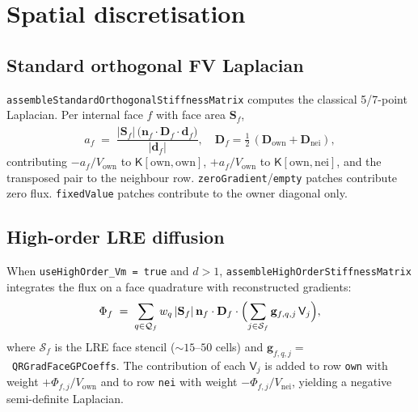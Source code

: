 \documentclass[11pt,a4paper]{article}
\newcommand{\Dten}{\mathbf{D}}
\newcommand{\Kstif}{\mathsf{K}}
\newcommand{\code}[1]{\texttt{\small #1}}
\begin{document}
\section{Spatial discretisation}

\subsection{Standard orthogonal FV Laplacian}

\code{assembleStandardOrthogonalStiffnessMatrix} computes the classical
5/7-point Laplacian. Per internal face $f$ with face area $\mathbf{S}_{f}$,
\begin{equation}
  a_{f} \;=\;
   \frac{ \lvert \mathbf{S}_{f} \rvert\,
          \bigl( \mathbf{n}_{f} \cdot \Dten_{f} \cdot \hat{\mathbf{d}}_{f} \bigr) }
        { \lvert \mathbf{d}_{f} \rvert },
   \quad
   \Dten_{f} = \tfrac{1}{2}\,(\Dten_{\text{own}} + \Dten_{\text{nei}}),
\end{equation}
contributing $-a_{f}/V_{\text{own}}$ to $\Kstif[\text{own},\text{own}]$,
$+a_{f}/V_{\text{own}}$ to $\Kstif[\text{own},\text{nei}]$, and the
transposed pair to the neighbour row. \code{zeroGradient}/\code{empty}
patches contribute zero flux. \code{fixedValue} patches contribute to
the owner diagonal only.

\subsection{High-order LRE diffusion}

When \code{useHighOrder\_Vm = true} and $d>1$,
\code{assembleHighOrderStiffnessMatrix} integrates the flux on a face
quadrature with reconstructed gradients:
\begin{equation}
  \Phi_{f} \;=\;
   \sum_{q \in \mathcal{Q}_{f}}
       w_{q}\, \lvert \mathbf{S}_{f} \rvert\,
       \mathbf{n}_{f} \cdot \Dten_{f} \cdot
       \Bigl(
         \sum_{j \in \mathcal{S}_{f}}
            \mathbf{g}_{f,q,j}\, \mathsf{V}_{j}
       \Bigr),
   \label{eq:HO-flux}
\end{equation}
where $\mathcal{S}_{f}$ is the LRE face stencil ($\sim 15$--$50$ cells)
and $\mathbf{g}_{f,q,j} = $~\code{QRGradFaceGPCoeffs}. The
contribution of each $\mathsf{V}_{j}$ is added to row \code{own} with
weight $+\Phi_{f,j}/V_{\text{own}}$ and to row \code{nei} with weight
$-\Phi_{f,j}/V_{\text{nei}}$, yielding a negative semi-definite
Laplacian.
\end{document}
